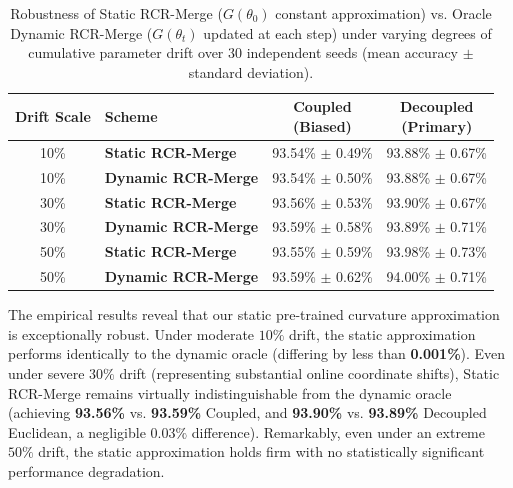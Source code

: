 \begin{table}[h]
\caption{Robustness of Static RCR-Merge ($G(\theta_0)$ constant approximation) vs. Oracle Dynamic RCR-Merge ($G(\theta_t)$ updated at each step) under varying degrees of cumulative parameter drift over 30 independent seeds (mean accuracy $\pm$ standard deviation).}
\label{tab:drift_robustness}
\vskip 0.1in
\begin{center}
\begin{small}
\begin{sc}
\begin{tabular}{c|l|cc}
\toprule
Drift Scale & Scheme & \shortstack{Coupled \\ (Biased)} & \shortstack{Decoupled \\ (Primary)} \\
\midrule
10\% & \textbf{Static RCR-Merge} & 93.54\% $\pm$ 0.49\% & 93.88\% $\pm$ 0.67\% \\
10\% & \textbf{Dynamic RCR-Merge} & 93.54\% $\pm$ 0.50\% & 93.88\% $\pm$ 0.67\% \\
\midrule
30\% & \textbf{Static RCR-Merge} & 93.56\% $\pm$ 0.53\% & 93.90\% $\pm$ 0.67\% \\
30\% & \textbf{Dynamic RCR-Merge} & 93.59\% $\pm$ 0.58\% & 93.89\% $\pm$ 0.71\% \\
\midrule
50\% & \textbf{Static RCR-Merge} & 93.55\% $\pm$ 0.59\% & 93.98\% $\pm$ 0.73\% \\
50\% & \textbf{Dynamic RCR-Merge} & 93.59\% $\pm$ 0.62\% & 94.00\% $\pm$ 0.71\% \\
\bottomrule
\end{tabular}
\end{sc}
\end{small}
\end{center}
\vskip -0.1in
\end{table}

The empirical results reveal that our static pre-trained curvature approximation is exceptionally robust. Under moderate $10\%$ drift, the static approximation performs identically to the dynamic oracle (differing by less than \textbf{0.001\%}). Even under severe $30\%$ drift (representing substantial online coordinate shifts), Static RCR-Merge remains virtually indistinguishable from the dynamic oracle (achieving \textbf{93.56\%} vs. \textbf{93.59\%} Coupled, and \textbf{93.90\%} vs. \textbf{93.89\%} Decoupled Euclidean, a negligible $0.03\%$ difference). Remarkably, even under an extreme $50\%$ drift, the static approximation holds firm with no statistically significant performance degradation.

